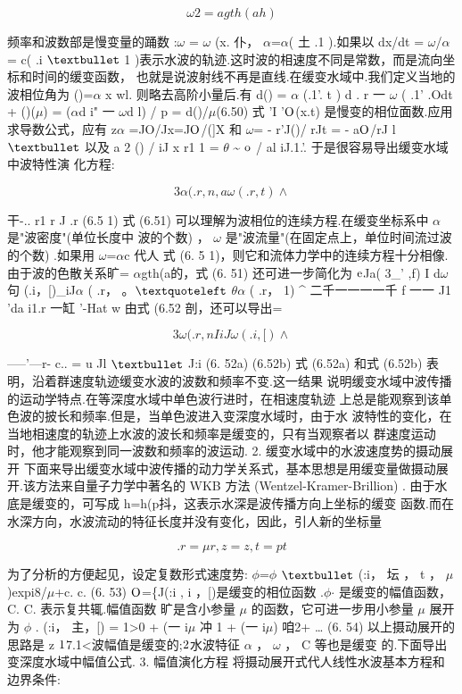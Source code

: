 \[\omega 2 = agth(ah)\]

频率和波数部是慢变量的踊数 :$\omega$ = $\omega$ (x. 仆， $\alpha$=$\alpha$( 土 .1 ).如果以 dx/dt = $\omega$/$\alpha$ = c( .i ${\rm •}$ 1 )表示水波的轨迹.这时波的相速度不同是常数，而是流向坐标和时间的缓变函数， 也就是说波射线不再是直线.在缓变水域中.我们定义当地的波相位角为 ()=$\alpha$ x wl. 则略去高阶小量后.有 d() = $\alpha$ (.1'. t ) d . r 一 $\omega$ ( .1' .Odt + ()($\mu$) = ($\alpha$d i" 一 $\omega$d l) / p = d()/$\mu$(6.50) 式 'I '${\rm O}$(x.t) 是慢变的相位面数.应用求导数公式，应有 z$\alpha$ =JO/Jx=J${\rm O}$/(]X 和 $\omega$= - r'J()/ rJt = - a${\rm O}$/rJ l ${\rm •}$ 以及 a 2 () / iJ x r1 1 = $\theta$ \textasciitilde{} ${\rm o}$ / al iJ.1.'. 于是很容易导出缓变水域中波特性演 化方程:

\[3\alpha  ( .r,  n , a\omega  ( .r,  t) \wedge \]

干-.. r1 r J .r (6.5 1) 式 (6.51) 可以理解为波相位的连续方程.在缓变坐标系中 $\alpha$ 是"波密度"(单位长度中 波的个数) ， $\omega$ 是"波流量"(在固定点上，单位时间流过波的个数) .如果用 $\omega$=$\alpha$c 代人 式 (6. 5 1)，则它和流体力学中的连续方程十分相像.由于波的色散关系旷= $\alpha$gth(a的，式 (6. 51) 还可进一步简化为 ${\rm e}$Ja( 3\_' ,f) I d$\omega$ 句 (.i，[)\_iJ$\alpha$ ( .r， 。${\rm ‘}$ $\theta$$\alpha$ ( .r， 1) \textasciicircum{} 二千一一一一千 f 一一 J1 'da i1.r 一缸 '-Hat w 由式 (6.52 剖，还可以导出=

\[3\omega  ( .r,  n I iJ \omega  ( .i, [) \wedge \]

-----'---r- c.. = u Jl ${\rm •}$ J:i (6. 52a) (6.52b) 式 (6.52a) 和式 (6.52b) 表明，沿着群速度轨迹缓变水波的波数和频率不变.这一结果 说明缓变水域中波传播的运动学特点.在等深度水域中单色波行进时，在相速度轨迹 上总是能观察到该单色波的披长和频率.但是，当单色波进入变深度水域时，由于水 波特性的变化，在当地相速度的轨迹上水波的波长和频率是缓变的，只有当观察者以 群速度运动时，他才能观察到同一波数和频率的波运动. 2. 缓变水域中的水波速度势的摄动展开 下面来导出缓变水域中波传播的动力学关系式，基本思想是用缓变量做摄动展 开.该方法来自量子力学中著名的 WKB 方法 (Wentzel-Kramer-Brillion) . 由于水底是缓变的，可写成 h=h(p抖，这表示水深是波传播方向上坐标的缓变 函数.而在水深方向，水波流动的特征长度并没有变化，因此，引人新的坐标量

\[.r =\mu r ,  z = z , t = pt\]

为了分析的方便起见，设定复数形式速度势: $\phi$=$\phi$ ${\rm •}$ (:i， 坛 ， t ， $\mu$)expi8/$\mu$+c. c. (6. 53) ${\rm O}$=\{J(:i , i ，[)是缓变的相位函数 .$\phi$$\cdot $ 是缓变的幅值函数， C. C. 表示复共辄.幅值函数 旷是含小参量 $\mu$ 的函数，它可进一步用小参量 $\mu$ 展开为 $\phi$ . (:i， 主，[) = 1>0 + (一 i$\mu$ 冲 1 + (一 i$\mu$) 咱2+ … (6. 54) 以上摄动展开的思路是 z ${\rm 1}$7.1<波幅值是缓变的;${\rm 2}$水波特征 $\alpha$ ， $\omega$ ， C 等也是缓变 的.下面导出变深度水域中幅值公式. 3. 幅值演化方程 将摄动展开式代人线性水波基本方程和边界条件:

